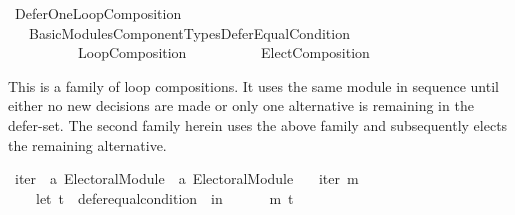 %
\begin{isabellebody}%
%
%
\isadelimdocument
\isanewline
%
\endisadelimdocument
%
\isatagdocument
\isanewline
\isanewline
%
\isamarkuptrue%
%
\endisatagdocument
{\isafolddocument}%
%
\isadelimdocument
%
\endisadelimdocument
%
\isadelimtheory
%
\endisadelimtheory
%
\isatagtheory
{}\isamarkupfalse%
\ Defer{\isacharunderscore}{\kern0pt}One{\isacharunderscore}{\kern0pt}Loop{\isacharunderscore}{\kern0pt}Composition\isanewline
\ \ \ {\isachardoublequoteopen}Basic{\isacharunderscore}{\kern0pt}Modules{\isacharslash}{\kern0pt}Component{\isacharunderscore}{\kern0pt}Types{\isacharslash}{\kern0pt}Defer{\isacharunderscore}{\kern0pt}Equal{\isacharunderscore}{\kern0pt}Condition{\isachardoublequoteclose}\isanewline
\ \ \ \ \ \ \ \ \ \ Loop{\isacharunderscore}{\kern0pt}Composition\isanewline
\ \ \ \ \ \ \ \ \ \ Elect{\isacharunderscore}{\kern0pt}Composition\isanewline
{}%
\endisatagtheory
{\isafoldtheory}%
%
\isadelimtheory
%
\endisadelimtheory
%
\begin{isamarkuptext}%
This is a family of loop compositions. It uses the same module in sequence
until either no new decisions are made or only one alternative is remaining
in the defer-set. The second family herein uses the above family and
subsequently elects the remaining alternative.%
\end{isamarkuptext}\isamarkuptrue%
%
\isadelimdocument
%
\endisadelimdocument
%
\isatagdocument
%
\isamarkuptrue%
%
\endisatagdocument
{\isafolddocument}%
%
\isadelimdocument
%
\endisadelimdocument
{}\isamarkupfalse%
\ iter\ {\isacharcolon}{\kern0pt}{\isacharcolon}{\kern0pt}\ {\isachardoublequoteopen}{\isacharprime}{\kern0pt}a\ Electoral{\isacharunderscore}{\kern0pt}Module\ {\isasymRightarrow}\ {\isacharprime}{\kern0pt}a\ Electoral{\isacharunderscore}{\kern0pt}Module{\isachardoublequoteclose}\ \isanewline
\ \ {\isachardoublequoteopen}iter\ m\ {\isacharequal}{\kern0pt}\isanewline
\ \ \ \ {\isacharparenleft}{\kern0pt}let\ t\ {\isacharequal}{\kern0pt}\ defer{\isacharunderscore}{\kern0pt}equal{\isacharunderscore}{\kern0pt}condition\ {}\ in\isanewline
\ \ \ \ \ \ {\isacharparenleft}{\kern0pt}m\ {\isasymcirclearrowleft}\isactrlsub t{\isacharparenright}{\kern0pt}{\isacharparenright}{\kern0pt}{\isachardoublequoteclose}\isanewline

\end{isabellebody}
